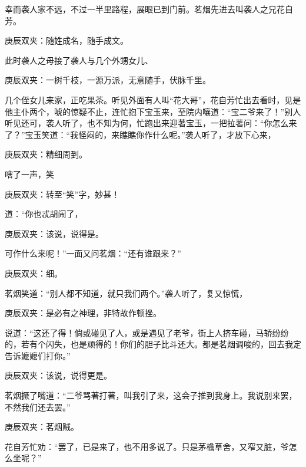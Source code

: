 \begin{parag}
    幸而袭人家不远，不过一半里路程，展眼已到门前。茗烟先进去叫袭人之兄花自芳。\begin{note}庚辰双夹：随姓成名，随手成文。\end{note}此时袭人之母接了袭人与几个外甥女儿、\begin{note}庚辰双夹：一树千枝，一源万派，无意随手，伏脉千里。\end{note}几个侄女儿来家，正吃果茶。听见外面有人叫“花大哥”，花自芳忙出去看时，见是他主仆两个，唬的惊疑不止，连忙抱下宝玉来，至院内嚷道：“宝二爷来了！”别人听见还可，袭人听了，也不知为何，忙跑出来迎著宝玉，一把拉著问：“你怎么来了？”宝玉笑道：“我怪闷的，来瞧瞧你作什么呢。”袭人听了，才放下心来，\begin{note}庚辰双夹：精细周到。\end{note}嗐了一声，笑\begin{note}庚辰双夹：转至“笑”字，妙甚！\end{note}道：“你也忒胡闹了，\begin{note}庚辰双夹：该说，说得是。\end{note}可作什么来呢！”一面又问茗烟：“还有谁跟来？”\begin{note}庚辰双夹：细。\end{note}茗烟笑道：“别人都不知道，就只我们两个。”袭人听了，复又惊慌，\begin{note}庚辰双夹：是必有之神理，非特故作顿挫。\end{note}说道：“这还了得！倘或碰见了人，或是遇见了老爷，街上人挤车碰，马轿纷纷的，若有个闪失，也是顽得的！你们的胆子比斗还大。都是茗烟调唆的，回去我定告诉嬷嬷们打你。”\begin{note}庚辰双夹：该说，说得更是。\end{note}茗烟撅了嘴道：“二爷骂著打著，叫我引了来，这会子推到我身上。我说别来罢，不然我们还去罢。”\begin{note}庚辰双夹：茗烟贼。\end{note}花自芳忙劝：“罢了，已是来了，也不用多说了。只是茅檐草舍，又窄又脏，爷怎么坐呢？”
\end{parag}


